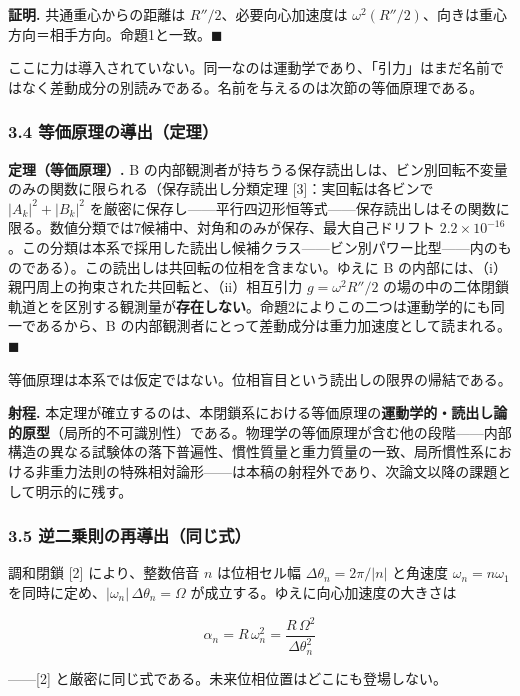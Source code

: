 \documentclass[
  a4paper,
]{ltjsarticle}
\begin{document}
\textbf{証明.} 共通重心からの距離は \(R''/2\)、必要向心加速度は
\(\omega^2(R''/2)\)、向きは重心方向＝相手方向。命題1と一致。\(\blacksquare\)

ここに力は導入されていない。同一なのは運動学であり、「引力」はまだ名前ではなく差動成分の別読みである。名前を与えるのは次節の等価原理である。

\subsubsection{3.4
等価原理の導出（定理）}\label{ux7b49ux4fa1ux539fux7406ux306eux5c0eux51faux5b9aux7406}

\textbf{定理（等価原理）.} B
の内部観測者が持ちうる保存読出しは、ビン別回転不変量のみの関数に限られる（保存読出し分類定理
{[}3{]}：実回転は各ビンで \(|A_k|^2+|B_k|^2\)
を厳密に保存し------平行四辺形恒等式------保存読出しはその関数に限る。数値分類では7候補中、対角和のみが保存、最大自己ドリフト
\(2.2\times10^{-16}\)。この分類は本系で採用した読出し候補クラス------ビン別パワー比型------内のものである）。この読出しは共回転の位相を含まない。ゆえに
B の内部には、（i）親円周上の拘束された共回転と、（ii）相互引力
\(g=\omega^2R''/2\)
の場の中の二体閉鎖軌道とを区別する観測量が\textbf{存在しない}。命題2によりこの二つは運動学的にも同一であるから、B
の内部観測者にとって差動成分は重力加速度として読まれる。\(\blacksquare\)

等価原理は本系では仮定ではない。位相盲目という読出しの限界の帰結である。

\textbf{射程.}
本定理が確立するのは、本閉鎖系における等価原理の\textbf{運動学的・読出し論的原型}（局所的不可識別性）である。物理学の等価原理が含む他の段階------内部構造の異なる試験体の落下普遍性、慣性質量と重力質量の一致、局所慣性系における非重力法則の特殊相対論形------は本稿の射程外であり、次論文以降の課題として明示的に残す。

\subsubsection{3.5
逆二乗則の再導出（同じ式）}\label{ux9006ux4e8cux4e57ux5247ux306eux518dux5c0eux51faux540cux3058ux5f0f}

調和閉鎖 {[}2{]} により、整数倍音 \(n\) は位相セル幅
\(\Delta\theta_n=2\pi/|n|\) と角速度 \(\omega_n=n\omega_1\)
を同時に定め、\(|\omega_n|\,\Delta\theta_n=\Omega\)
が成立する。ゆえに向心加速度の大きさは

\[
\alpha_n=R\,\omega_n^2=\frac{R\,\Omega^2}{\Delta\theta_n^2}
\]

------{[}2{]} と厳密に同じ式である。未来位相位置はどこにも登場しない。
\end{document}
